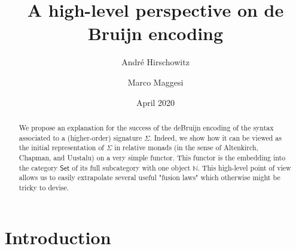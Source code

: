 \documentclass[a4paper,twoside,12pt]{article}
\title{A high-level perspective on de Bruijn encoding}
\author{Andr\'e Hirschowitz \and Marco Maggesi}
\date{April 2020}
\theoremstyle{definition}
\theoremstyle{remark}
\theoremstyle{example}
\newcommand{\NN}{\mathbb{N}}
\begin{document}
\maketitle

\begin{abstract}

  We propose an explanation for the success of the deBruijn encoding
  of the syntax associated to a (higher-order) signature $\Sigma$.
  Indeed, we show how it can be viewed as the initial representation
  of $\Sigma$ in relative monads (in the sense of Altenkirch, Chapman,
  and Uustalu) on a very simple functor.  This functor is the
  embedding into the category $\mathsf{Set}$ of its full subcategory
  with one object $\NN$.  This high-level point of view allows us to
  easily extrapolate several useful "fusion laws" which otherwise
  might be tricky to devise.
\end{abstract}

\tableofcontents{}

\section{Introduction}
\label{sec:intro}


\end{document}
